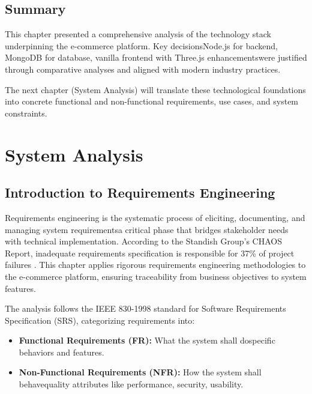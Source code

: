 \documentclass[12pt, a4paper]{report}
\begin{document}
\section{Summary}

This chapter presented a comprehensive analysis of the technology stack underpinning the e-commerce platform. Key decisionsNode.js for backend, MongoDB for database, vanilla frontend with Three.js enhancementswere justified through comparative analyses and aligned with modern industry practices.

The next chapter (System Analysis) will translate these technological foundations into concrete functional and non-functional requirements, use cases, and system constraints.


\chapter{System Analysis}

\section{Introduction to Requirements Engineering}

Requirements engineering is the systematic process of eliciting, documenting, and managing system requirementsa critical phase that bridges stakeholder needs with technical implementation. According to the Standish Group's CHAOS Report, inadequate requirements specification is responsible for 37\% of project failures \cite{standish2020}. This chapter applies rigorous requirements engineering methodologies to the e-commerce platform, ensuring traceability from business objectives to system features.

The analysis follows the IEEE 830-1998 standard for Software Requirements Specification (SRS), categorizing requirements into:

\begin{itemize}
    \item \textbf{Functional Requirements (FR):} What the system shall dospecific behaviors and features.
    \item \textbf{Non-Functional Requirements (NFR):} How the system shall behavequality attributes like performance, security, usability.
\end{itemize}
\end{document}
